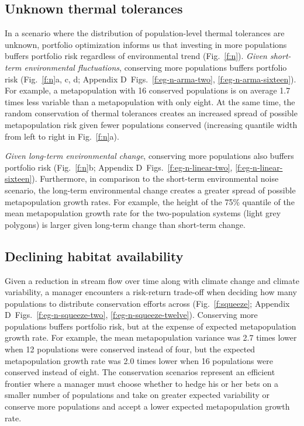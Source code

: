 \documentclass[12pt,english]{article}
\newcommand{\somts}{Appendix D}
\begin{document}
\begin{spacing}{1.3}
\subsection{Unknown thermal tolerances}\label{unknown-thermal-tolerances}

In a scenario where the distribution of population-level thermal tolerances are unknown, portfolio optimization informs us that investing in more populations buffers portfolio risk regardless of environmental trend (Fig.~\ref{f:n}). \emph{Given short-term environmental fluctuations}, conserving more populations buffers portfolio risk (Fig.~\ref{f:n}a, c, d; \somts~Figs.~\ref{f:eg-n-arma-two}, \ref{f:eg-n-arma-sixteen}). For example, a metapopulation with 16 conserved populations is on average 1.7 times less variable than a metapopulation with only eight. At the same time, the random conservation of thermal tolerances creates an increased spread of possible metapopulation risk given fewer populations conserved (increasing quantile width from left to right in Fig.~\ref{f:n}a).

\emph{Given long-term environmental change}, conserving more populations also buffers portfolio risk (Fig.~\ref{f:n}b; \somts~Figs.~\ref{f:eg-n-linear-two}, \ref{f:eg-n-linear-sixteen}). Furthermore, in comparison to the short-term environmental noise scenario, the long-term environmental change creates a greater spread of possible metapopulation growth rates. For example, the height of the 75\% quantile of the mean metapopulation growth rate for the two-population systems (light grey polygons) is larger given long-term change than short-term change.

\subsection{Declining habitat availability}\label{declining-habitat-availability}

Given a reduction in stream flow over time along with climate change and climate variability, a manager encounters a risk-return trade-off when deciding how many populations to distribute conservation efforts across (Fig.~\ref{f:squeeze}; \somts~Figs.~\ref{f:eg-n-squeeze-two}, \ref{f:eg-n-squeeze-twelve}). Conserving more populations buffers portfolio risk, but at the expense of expected metapopulation growth rate. For example, the mean metapopulation variance was 2.7 times lower when 12 populations were conserved instead of four, but the expected metapopulation growth rate was 2.0 times lower when 16 populations were conserved instead of eight. The conservation scenarios represent an efficient frontier where a manager must choose whether to hedge his or her bets on a smaller number of populations and take on greater expected variability or conserve more populations and accept a lower expected metapopulation growth rate.


\end{spacing}
\end{document}
